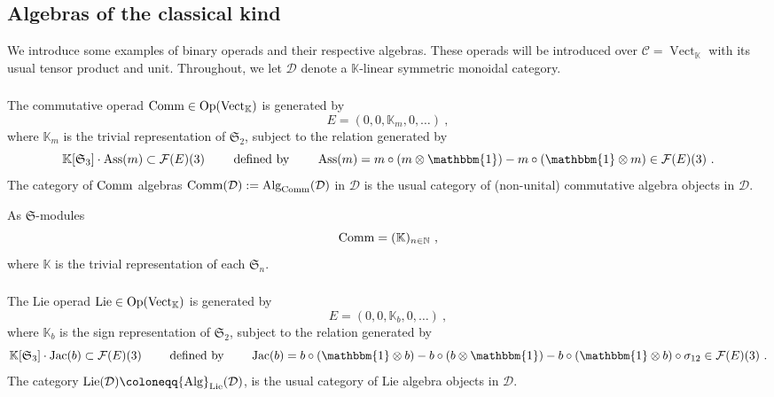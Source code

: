 \documentclass[11pt]{amsart}
\numberwithin{equation}{section}
\theoremstyle{definition}
\newcommand{\bb}{\mathbb}
\newcommand{\mc}{\mathcal}
\newcommand{\mf}{\mathfrak}
\newcommand{\D}{{\mathcal{D}}}
\DeclareMathOperator{\Vect}{Vect}
\newcommand{\K}{{\bb K}}
\newcommand{\ik}{{\bb K}}
\newcommand{\Alg}{{\textup{Alg}}}
\newcommand{\Comm}{{\textup{Comm}}}
\newcommand{\Lie}{{\textup{Lie}}}
\newcommand{\Op}{{\textup{Op}}}
\newcommand{\Ass}{{\textup{Ass}}}
\newcommand{\Ss}{{{\mf{S}}}}
\newcommand{\CC}{{\textup{CC}}}
\newcommand{\0}{{\textbf{0}}}
\newcommand{\id}{{\textup{id}}}
\def\IN{\mathbb{N}}
\def\CC{{\mc C}}
\def\FF{{\mc F}}
\def \mf{\mathfrak}
\def \id{\mathbbm{1}}
\def \Op{\mathrm{Op}}
\begin{document}

\subsection{Algebras of the classical kind}\label{ssec:operad examples}

We introduce some examples of binary operads and their respective algebras. These operads will be introduced over $\CC=\Vect_{\ik}$ with its usual tensor product and unit. Throughout, we let $\D$ denote a $\ik$-linear symmetric monoidal category.

\subsubsection{}

The commutative operad $\Comm\in \Op(\Vect_\ik)$ is generated by 
\[
E = (0,0,\ik_m,0,\dots)~,
\]
where $\ik_m$ is the trivial representation of $\Ss_2$, subject to the relation generated by
\[
\ik[\Ss_3]\cdot\Ass(m)\subset \FF(E)(3) \qquad \text{ defined by } \qquad \Ass(m) =  m\circ(m\otimes \id) - m\circ (\id\otimes m)\in \FF(E)(3)~.
\]
The category of $\Comm$ algebras $\Comm(\mc D):=\Alg_{\Comm }(\mc D)$ in $\mc D$ is the usual category of (non-unital) commutative algebra objects in $\mc D$.

As $\Ss$-modules
\[
\Comm = (\ik)_{n\in\IN}~,
\]
where $\ik$ is the trivial representation of each $\Ss_n$.

\subsubsection{}\label{Lieop}

The Lie operad $\Lie\in \Op(\Vect_\K)$ is generated by 
\[
E=(0,0,\K_b,0,\dots)~,
\]
where $\ik_b$ is the sign representation of $\Ss_2$, subject to the relation generated by
\[
\ik[\Ss_3]\cdot\text{Jac}(b) \subset \mc F(E)(3) \qquad\text{ defined by } \qquad  \text{Jac}(b)= b\circ( \id \otimes b) - b\circ( b\otimes \id) - b \circ (\id \otimes b)\circ \sigma_{12}\in \FF(E)(3) ~.
\]
The category $\Lie(\D) \coloneqq \Alg_\Lie(\D)$, is the usual category of Lie algebra objects in $\D$.
\end{document}
